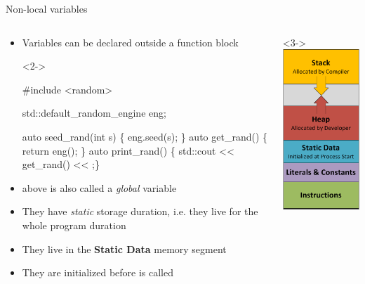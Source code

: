 \begin{frame}[fragile]{Non-local variables}

  \begin{columns}
    \begin{column}{.75\textwidth}
      \begin{itemize}
      \item Variables can be declared outside a function block
        \begin{codeblock}<2->{
#include <random>

std::default_random_engine eng;

auto seed_rand(int s) \{ eng.seed(s); \}
auto get_rand() \{ return eng(); \}
auto print_rand() \{ std::cout << get_rand() << \bslashn{};\}}\end{codeblock}

      \item<2->  above is also called a \textit{global} variable
      \item<3-> They have \textit{static} storage duration, i.e. they live for the
        whole program duration
      \item<3-> They live in the \textbf{Static Data} memory segment
      \item<4-> They are initialized before  is called
      \end{itemize}

    \end{column}
    \begin{column}{.25\textwidth}<3->
      \centering\includegraphics[height=.5\textheight]{images/process-memory-layout}
    \end{column}
  \end{columns}
\end{frame}

